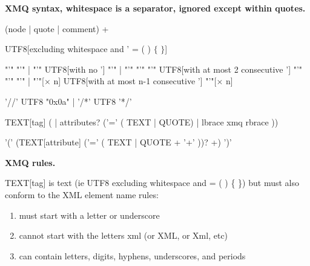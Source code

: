 \documentclass[10pt,a4paper]{article}
\begin{document}
\textbf{XMQ syntax, whitespace is a separator, ignored except within quotes.}

\raisebox{32pt}{xmq:}
\begin{minipage}{15cm}
\begin{rail}
  (node | quote | comment) +
\end{rail}
\end{minipage}

\raisebox{-4pt}{TEXT:}
\begin{minipage}{15cm}
\begin{rail}
UTF8[excluding whitespace and ' = ( ) $\lbrace$ $\rbrace$]
\end{rail}
\end{minipage}

\raisebox{32pt}{QUOTE:}
\begin{minipage}{15cm}
\begin{rail}
  "'" "'"
  | "'" UTF8[with no '] "'"
  | "'" "'" "'" UTF8[with at most 2 consecutive '] "'" "'" "'"
  | "'"[$\times$ n] UTF8[with at most n-1 consecutive '] "'"[$\times$ n]
\end{rail}
\end{minipage}

\raisebox{8pt}{COMMENT:}
\begin{minipage}{15cm}
\begin{rail}
  '//' UTF8 "0x0a"
  | '/*' UTF8 '*/'
\end{rail}
\end{minipage}

\raisebox{32pt}{node:}
\begin{minipage}{15cm}
\begin{rail}
  TEXT[tag] ( | attributes? ('=' ( TEXT | QUOTE) | lbrace xmq rbrace ))
\end{rail}
\end{minipage}

\raisebox{45pt}{attributes:}
\begin{minipage}{15cm}
\begin{rail}
'(' (TEXT[attribute] ('=' ( TEXT | QUOTE + '+' ))? +) ')'
\end{rail}
\end{minipage}

\newpage

\textbf{XMQ rules.}

TEXT[tag] is text (ie UTF8 excluding whitespace and = ( ) \{ \})
but must also conform to the XML element name rules:
\begin{enumerate}
  \item{must start with a letter or underscore}
  \item{cannot start with the letters xml (or XML, or Xml, etc)}
  \item{can contain letters, digits, hyphens, underscores, and periods}
\end{enumerate}
\end{document}
